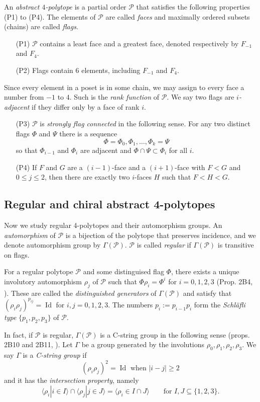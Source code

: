 \documentclass{article}
\theoremstyle{definition}
\newcommand{\p}{\mathcal{P}}
\DeclareMathOperator{\Id}{Id}
\begin{document}
	An \textit{abstract $4$-polytope} is a partial order $\p$ that satisfies the following properties (P1) to (P4). The elements of $\p$ are called \textit{faces} and maximally ordered subsets (chains) are called \textit{flags}.
	\begin{enumerate}
		\item[(P1)]\label{P1} $\p$ contains a least face and a greatest face, denoted respectively by $F_{-1}$ and $F_4$.
		\item[(P2)]\label{P2} Flags contain $6$ elements, including $F_{-1}$ and $F_4$.
	\end{enumerate}
	Since every element in a poset is in some chain, we may assign to every face a number from $-1$ to $4$. Such is the \textit{rank function} of $\p$. We say two flags are \textit{$i$-adjacent} if they differ only by a face of rank $i$.
	\begin{enumerate}
		\item[(P3)]\label{P3} $\p$ is \textit{strongly flag connected} in the following sense. For any two distinct flags $\Phi$ and $\Psi$ there is a sequence
		\[\Phi=\Phi_0,\Phi_1,\ldots,\Phi_k=\Psi\]
		so that $\Phi_{i-1}$ and $\Phi_i$ are adjacent and $\Phi\cap\Psi\subset\Phi_i$ for all $i$.
		\item[(P4)]\label{P4} If $F$ and $G$ are a $(i-1)$-face and a $(i+1)$-face with $F<G$ and $0\leq j\leq2$, then there are exactly two $i$-faces $H$ such that $F<H<G$.
	\end{enumerate}
	
		\subsection{Regular and chiral abstract 4-polytopes}
	Now we study regular 4-polytopes and their automorphism groups. An \textit{automorphism} of $\p$ is a bijection of the polytope that preserves incidence, and we denote automorphism group by $\Gamma(\p)$. $\p$ is called \textit{regular} if $\Gamma(\p)$ is transitive on flags.
	
	For a regular polytope $\p$ and some distinguised flag $\Phi$, there exists a unique involutory automorphism $\rho_j$ of $\p$ such that $\Phi\rho_i=\Phi^i$ for $i=0,1,2,3$ (Prop. 2B4, \cite{abstract-polytopes}). These are called the \textit{distinguished generators} of $\Gamma(\p)$ and satisfy that $(\rho_i\rho_j)^{p_{ij}}=\Id$ for $i,j=0,1,2,3$. The numbers $p_i:=p_{i-1}p_i$ form the \textit{Schläfli type} $\{p_1,p_2,p_3\}$ of $\p$.
	
	In fact, if $\p$ is regular, $\Gamma(\p)$ is a C-string group in the following sense (props. 2B10 and 2B11, \cite{abstract-polytopes}). Let $\Gamma$ be a group generated by the involutions $\rho_0,\rho_1,\rho_2,\rho_3$. We say $\Gamma$ is a \textit{C-string group} if
	\[(\rho_i\rho_j)^2=\Id\text{ when } |i-j|\geq2\]
	and it has the \textit{intersection property}, namely
	\[\langle \rho_i|i\in I\rangle\cap\langle\rho_j|j\in J\rangle=\langle\rho_i\in I\cap J\rangle\qquad\text{for }I,J\subseteq\{1,2,3\}.\]
\end{document}
